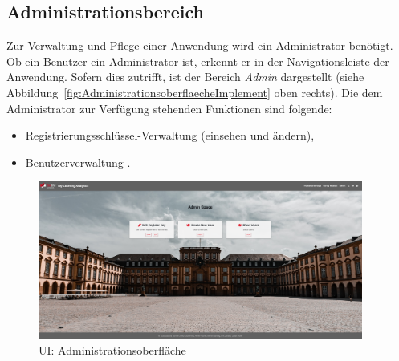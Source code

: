 
\subsection{Administrationsbereich}
\label{ssec:Administrationsbereich}

Zur Verwaltung und Pflege einer Anwendung wird ein Administrator benötigt.
Ob ein Benutzer ein Administrator ist, erkennt er in der Navigationsleiste der Anwendung.
Sofern dies zutrifft, ist der Bereich \emph{Admin} dargestellt (siehe Abbildung~\vref{fig:AdministrationsoberflaecheImplement} oben rechts). \newline
Die dem Administrator zur Verfügung stehenden Funktionen sind folgende:
%
\begin{itemize}
    \item Registrierungsschlüssel-Verwaltung \faKey\xspace (einsehen und ändern),
	\item Benutzerverwaltung \faUsers.
\end{itemize}
%
\begin{figure}[h]
	\centering
	\includegraphics[width=0.95\textwidth, keepaspectratio]{img/client/Admin.png}
	\captionsetup{justification=centering, format=plain}
	\caption[\acl{UI}: Administrationsoberfläche]{\acl{UI}: Administrationsoberfläche \\ \quelleScreenshot}
	\label{fig:AdministrationsoberflaecheImplement}
\end{figure}
%






